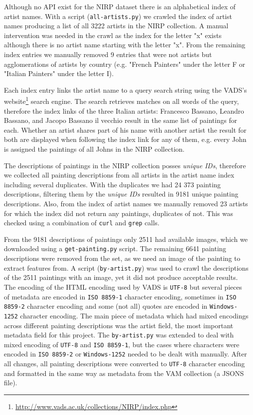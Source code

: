 \documentclass[11pt,a4paper,twoside,openright]{report}
\begin{document}
Although no API exist for the NIRP dataset there is an alphabetical index of
artist names.  With a script (\texttt{all-artists.py}) we crawled the index of
artist names producing a list of all 3222 artists in the NIRP collection.
A manual intervention was needed in the crawl as the index for the letter "x"
exists although there is no artist name starting with the letter "x".  From the
remaining index entries we manually removed 9 entries that were not artists but
agglomerations of artists by country (e.g. "French Painters" under the letter F
or "Italian Painters" under the letter I).

Each index entry links the artist name to a query search string using the
VADS's website\footnote{\href{http://www.vads.ac.uk/collections/NIRP/index.php}
{http://www.vads.ac.uk/collections/NIRP/index.php}} search engine.  The search
retrieves matches on all words of the query, therefore the index links of the
three Italian artists: Francesco Bassano, Leandro Bassano, and Jacopo Bassano
il vecchio result in the same list of paintings for each.  Whether an artist
shares part of his name with another artist the result for both are displayed
when following the index link for any of them, e.g. every John is assigned the
paintings of all Johns in the NIRP collection.

The descriptions of paintings in the NIRP collection posses \emph{unique IDs},
therefore we collected all painting descriptions from all artists in the artist
name index including several duplicates.  With the duplicates we had 24 373
painting descriptions, filtering them by the \emph{unique IDs} resulted in 9181
unique painting descriptions.  Also, from the index of artist names we manually
removed 23 artists for which the index did not return any paintings, duplicates
of not.  This was checked using a combination of \texttt{curl} and
\texttt{grep} calls.

From the 9181 descriptions of paintings only 2511 had available images, which
we downloaded using a \texttt{get-painting.py} script.  The remaining 6641
painting descriptions were removed from the set, as we need an image of the
painting to extract features from.  A script (\texttt{by-artist.py}) was used
to crawl the descriptions of the 2511 paintings with an image, yet it did not
produce acceptable results.  The encoding of the HTML encoding used by VADS is
\texttt{UTF-8} but several pieces of metadata are encoded in \texttt{ISO
8859-1} character encoding, sometimes in \texttt{ISO 8859-2} character encoding
and some (not all) quotes are encoded in \texttt{Windows-1252} character
encoding.  The main piece of metadata which had mixed encodings across
different painting descriptions was the artist field, the most important
metadata field for this project.  The \texttt{by-artist.py} was extended to
deal with mixed encoding of \texttt{UTF-8} and \texttt{ISO 8859-1}, but the
cases where characters were encoded in \texttt{ISO 8859-2} or
\texttt{Windows-1252} needed to be dealt with manually.  After all changes, all
painting descriptions were converted to \texttt{UTF-8} character encoding and
formatted in the same way as metadata from the VAM collection (a JSONS file).
\end{document}
